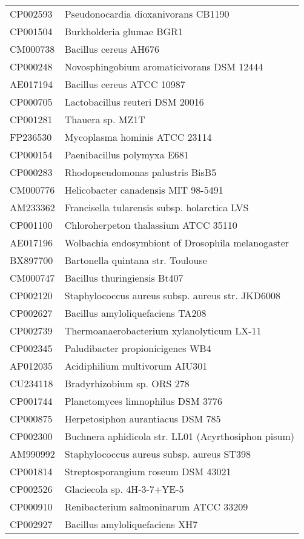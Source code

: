 \begin{longtable}{ll}
CP002593 & Pseudonocardia dioxanivorans CB1190\\
CP001504 & Burkholderia glumae BGR1\\
CM000738 & Bacillus cereus AH676\\
CP000248 & Novosphingobium aromaticivorans DSM 12444\\
AE017194 & Bacillus cereus ATCC 10987\\
CP000705 & Lactobacillus reuteri DSM 20016\\
CP001281 & Thauera sp. MZ1T\\
FP236530 & Mycoplasma hominis ATCC 23114\\
CP000154 & Paenibacillus polymyxa E681\\
CP000283 & Rhodopseudomonas palustris BisB5\\
CM000776 & Helicobacter canadensis MIT 98-5491\\
AM233362 & Francisella tularensis subsp. holarctica LVS\\
CP001100 & Chloroherpeton thalassium ATCC 35110\\
AE017196 & Wolbachia endosymbiont of Drosophila melanogaster\\
BX897700 & Bartonella quintana str. Toulouse\\
CM000747 & Bacillus thuringiensis Bt407\\
CP002120 & Staphylococcus aureus subsp. aureus str. JKD6008\\
CP002627 & Bacillus amyloliquefaciens TA208\\
CP002739 & Thermoanaerobacterium xylanolyticum LX-11\\
CP002345 & Paludibacter propionicigenes WB4\\
AP012035 & Acidiphilium multivorum AIU301\\
CU234118 & Bradyrhizobium sp. ORS 278\\
CP001744 & Planctomyces limnophilus DSM 3776\\
CP000875 & Herpetosiphon aurantiacus DSM 785\\
CP002300 & Buchnera aphidicola str. LL01 (Acyrthosiphon pisum)\\
AM990992 & Staphylococcus aureus subsp. aureus ST398\\
CP001814 & Streptosporangium roseum DSM 43021\\
CP002526 & Glaciecola sp. 4H-3-7+YE-5\\
CP000910 & Renibacterium salmoninarum ATCC 33209\\
CP002927 & Bacillus amyloliquefaciens XH7\\

\end{longtable}
